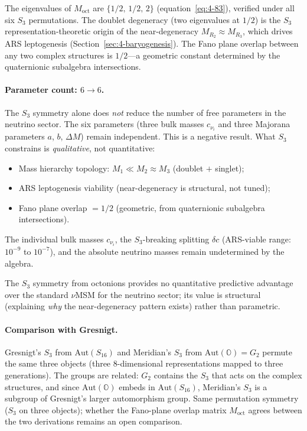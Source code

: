 The eigenvalues of $M_{\mathrm{oct}}$ are $\{1/2,\, 1/2,\, 2\}$ (equation~\eqref{eq:4-83}), verified under all six $S_3$ permutations.  The doublet degeneracy (two eigenvalues at $1/2$) is the $S_3$ representation-theoretic origin of the near-degeneracy $M_{R_2} \approx M_{R_3}$, which drives ARS leptogenesis (Section~\ref{sec:4-baryogenesis}).  The Fano plane overlap between any two complex structures is $1/2$---a geometric constant determined by the quaternionic subalgebra intersections.

\paragraph{Parameter count: $6 \to 6$.}
The $S_3$ symmetry alone does \emph{not} reduce the number of free parameters in the neutrino sector.  The six parameters (three bulk masses $c_{\nu_i}$ and three Majorana parameters $a$, $b$, $\Delta M$) remain independent.  This is a negative result.  What $S_3$ constrains is \emph{qualitative}, not quantitative:
\begin{itemize}
  \item Mass hierarchy topology: $M_1 \ll M_2 \approx M_3$ (doublet $+$ singlet);
  \item ARS leptogenesis viability (near-degeneracy is structural, not tuned);
  \item Fano plane overlap $= 1/2$ (geometric, from quaternionic subalgebra intersections).
\end{itemize}
The individual bulk masses $c_{\nu_i}$, the $S_3$-breaking splitting $\delta c$ (ARS-viable range: $10^{-9}$ to $10^{-7}$), and the absolute neutrino masses remain undetermined by the algebra.

The $S_3$ symmetry from octonions provides no quantitative predictive advantage over the standard $\nu$MSM for the neutrino sector; its value is structural (explaining \emph{why} the near-degeneracy pattern exists) rather than parametric.

\paragraph{Comparison with Gresnigt.}
Gresnigt's $S_3$ from $\mathrm{Aut}(S_{16})$ and Meridian's $S_3$ from $\mathrm{Aut}(\mathbb{O}) = G_2$ permute the same three objects (three 8-dimensional representations mapped to three generations).  The groups are related: $G_2$ contains the $S_3$ that acts on the complex structures, and since $\mathrm{Aut}(\mathbb{O})$ embeds in $\mathrm{Aut}(S_{16})$, Meridian's $S_3$ is a subgroup of Gresnigt's larger automorphism group.  Same permutation symmetry ($S_3$ on three objects); whether the Fano-plane overlap matrix $M_\mathrm{oct}$ agrees between the two derivations remains an open comparison.


